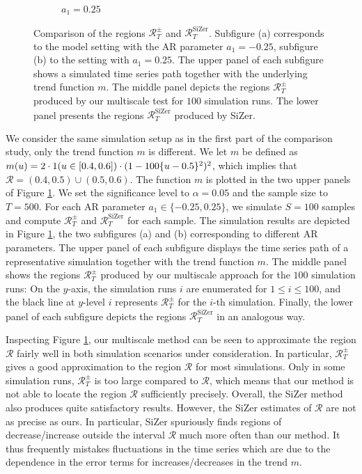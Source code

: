 \begin{figure}[t]
\begin{subfigure}{.5\textwidth}
\caption{$a_1 = 0.25$}
\end{subfigure}
\caption{Comparison of the regions $\mathcal{R}_T^\pm$ and $\mathcal{R}_T^{\text{SiZer}}$. Subfigure (a) corresponds to the model setting with the AR parameter $a_1 = -0.25$, subfigure (b) to the setting with $a_1 = 0.25$. The upper panel of each subfigure shows a simulated time series path together with the underlying trend function $m$. The middle panel depicts the regions $\mathcal{R}_T^\pm$ produced by our multiscale test for $100$ simulation runs. The lower panel presents the regions $\mathcal{R}_T^{\text{SiZer}}$ produced by SiZer.}  
\label{fig:comparison_SiZer}
\end{figure}


We consider the same simulation setup as in the first part of the comparison study, only the trend function $m$ is different. We let $m$ be defined as $m(u) = 2 \cdot 1(u \in [0.4,0.6]) \cdot (1 - 100 \{u-0.5\}^2)^2$, which implies that $\mathcal{R} = (0.4,0.5) \cup (0.5,0.6)$. The function $m$ is plotted in the two upper panels of Figure \ref{fig:comparison_SiZer}. We set the significance level to $\alpha= 0.05$ and the sample size to $T=500$. For each AR parameter $a_1 \in \{ -0.25,0.25 \}$, we simulate $S=100$ samples and compute $\mathcal{R}_T^\pm$ and $\mathcal{R}_T^{\text{SiZer}}$ for each sample. The simulation results are depicted in Figure \ref{fig:comparison_SiZer}, the two subfigures (a) and (b) corresponding to different AR parameters. The upper panel of each subfigure displays the time series path of a representative simulation together with the trend function $m$. The middle panel shows the regions $\mathcal{R}_T^\pm$ produced by our multiscale approach for the $100$ simulation runs: On the $y$-axis, the simulation runs $i$ are enumerated for $1 \le i \le 100$, and the black line at $y$-level $i$ represents $\mathcal{R}_T^\pm$ for the $i$-th simulation. Finally, the lower panel of each subfigure depicts the regions $\mathcal{R}_T^{\text{SiZer}}$ in an analogous way. 


Inspecting Figure \ref{fig:comparison_SiZer}, our multiscale method can be seen to approximate the region $\mathcal{R}$ fairly well in both simulation scenarios under consideration. In particular, $\mathcal{R}_T^\pm$ gives a good approximation to the region $\mathcal{R}$ for most simulations. Only in some simulation runs, $\mathcal{R}_T^\pm$ is too large compared to $\mathcal{R}$, which means that our method is not able to locate the region $\mathcal{R}$ sufficiently precisely. Overall, the SiZer method also produces quite satisfactory results. However, the SiZer estimates of $\mathcal{R}$ are not as precise as ours. In particular, SiZer spuriously finds regions of decrease/increase outside the interval $\mathcal{R}$ much more often than our method. It thus frequently mistakes fluctuations in the time series which are due to the dependence in the error terms for increases/decreases in the trend $m$. 

